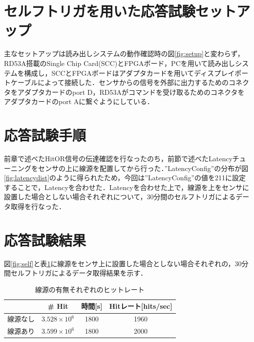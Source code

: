 \section{セルフトリガを用いた応答試験セットアップ}
\label{sec:selfsetup}
主なセットアップは読み出しシステムの動作確認時の図\ref{fig:setup}と変わらず，RD53A搭載のSingle Chip Card(SCC)とFPGAボード，PCを用いて読み出しシステムを構成し，SCCとFPGAボードはアダプタカードを用いてディスプレイポートケーブルによって接続した．センサからの信号を外部に出力するためのコネクタをアダプタカードのport D，RD53Aがコマンドを受け取るためのコネクタをアダプタカードのport Aに繋ぐようにしている．

\section{応答試験手順}
\label{sec:selfhow}
前章で述べたHitOR信号の伝達確認を行なったのち，前節で述べたLatencyチューニングをセンサの上に線源を配置してから行った．''LatencyConfig''の分布が図\ref{fig:latencydist}のように得られたため，今回は''LatencyConfig''の値を211に設定することで，Latencyを合わせた．Latencyを合わせた上で，線源を上をセンサに設置した場合としない場合それぞれについて，30分間のセルフトリガによるデータ取得を行なった．

\section{応答試験結果}
\label{sec:selfconc}
図\ref{fig:self}と表\ref{tab:self}に線源をセンサ上に設置した場合としない場合それぞれの，30分間セルフトリガによるデータ取得結果を示す．

\begin{table}[h]
  \centering
  \caption{線源の有無それぞれのヒットレート}
  \begin{tabular} {|l|c|c||c|} \hline
     & \# Hit & 時間[s] & Hitレート[hits/sec] \\  \hline
    線源なし & $3.528 \times 10^6$ & 1800 & 1960 \\ 
    線源あり & $3.599 \times 10^6$ & 1800 & 2000 \\ \hline
  \end{tabular}
  \label{tab:self}
\end{table}

